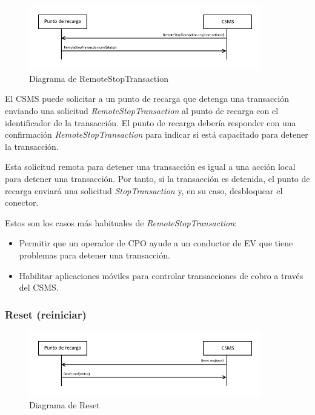 \documentclass[12pt,a4paper,onecolumn,oneside]{report}
\begin{document}
\begin{figure}[h] 
\centering
  \includegraphics[width=0.9\textwidth]{figuras/diagramaremotestoptransaction.png}
  \caption[Diagrama de \textit{RemoteStopTransaction}]{Diagrama de RemoteStopTransaction\\
  }
  \label{fig:diagramaremotestoptransaction}
\end{figure}


El CSMS puede solicitar a un punto de recarga que detenga una transacción enviando una solicitud \textit{RemoteStopTransaction} al punto de recarga con el identificador de la transacción. El punto de recarga debería responder con una confirmación \textit{RemoteStopTransaction} para indicar si está capacitado para detener la transacción.

Esta solicitud remota para detener una transacción es igual a una acción local para detener una transacción. Por tanto, si la transacción es detenida, el punto de recarga enviará una solicitud \textit{StopTransaction} y, en su caso, desbloquear el conector.

Estos son los casos más habituales de \textit{RemoteStopTransaction}:
\begin{itemize}
\item Permitir que un operador de CPO ayude a un conductor de EV que tiene problemas para detener una transacción.
\item Habilitar aplicaciones móviles para controlar transacciones de cobro a través del CSMS.

\end{itemize}


\subsubsection{Reset (reiniciar)}
\label{Reset (reiniciar)}


\begin{figure}[h] 
\centering
  \includegraphics[width=0.9\textwidth]{figuras/diagramareset.png}
  \caption[Diagrama de \textit{Reset}]{Diagrama de Reset\\
  }
  \label{fig:diagramareset}
\end{figure}
\end{document}
